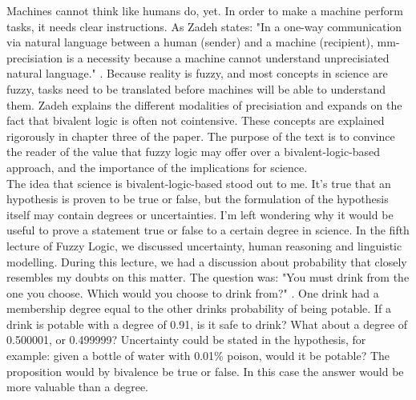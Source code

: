 


Machines cannot think like humans do, yet. In order to make a machine perform tasks, it needs clear instructions. As Zadeh states: "In a one-way communication via natural language between a human (sender) and a machine (recipient), mm-precisiation is a necessity because a machine cannot understand unprecisiated natural language." \cite[2760]{is_there_a_need_for_fuzzy_logic}. Because reality is fuzzy, and most concepts in science are fuzzy, tasks need to be translated before machines will be able to understand them.
Zadeh explains the different modalities of precisiation and expands on the fact that bivalent logic is often not cointensive. These concepts are explained rigorously in chapter three of the paper.
The purpose of the text is to convince the reader of the value that fuzzy logic may offer over a bivalent-logic-based approach, and the importance of the implications for science. \\

The idea that science is bivalent-logic-based stood out to me. It's true that an hypothesis is proven to be true or false, but the formulation of the hypothesis itself may contain degrees or uncertainties. I'm left wondering why it would be useful to prove a statement true or false to a certain degree in science.
In the fifth lecture of Fuzzy Logic, we discussed uncertainty, human reasoning and linguistic modelling. During this lecture, we had a discussion about probability that closely resembles my doubts on this matter. The question was: "You must drink from the one you choose. Which would you choose to drink from?" \cite[slide. 9]{lecture_5_uncertainty}. One drink had a membership degree equal to the other drinks probability of being potable. If a drink is potable with a degree of 0.91, is it safe to drink? What about a degree of 0.500001, or 0.499999? Uncertainty could be stated in the hypothesis, for example: given a bottle of water with 0.01\% poison, would it be potable? The proposition would by bivalence be true or false. In this case the answer would be more valuable than a degree. \\

